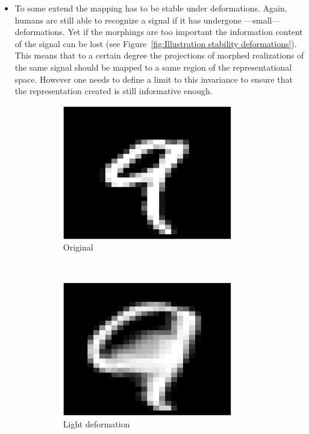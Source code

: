 \documentclass[a4paper,11pt]{report}
\begin{document}
\begin{itemize}
				\item To some extend the mapping has to be stable under deformations. Again, humans are still able to recognize a signal if it has undergone ---small--- deformations. Yet if the morphings are too important the information content of the signal can be lost (see Figure~\ref{fig:Illustration stability deformations}). This means that to a certain degree the projections of morphed realizations of the same signal should be mapped to a same region of the representational space. However one needs to define a limit to this invariance to ensure that the representation created is still informative enough.\\
				
				\begin{figure}[h]
					\centering
					\begin{subfigure}[t]{0.48\textwidth}
						\centering
						\includegraphics[height=2.3in]{im_nine_ori.eps}
						\caption{\centering Original}
					\end{subfigure}%
					~
					\begin{subfigure}[t]{0.48\textwidth}
						\centering
						\includegraphics[height=2.3in]{im_nine_def_Vsmall.eps}
						\caption{\centering Light deformation}
					\end{subfigure}%
					\\
					~
					\begin{subfigure}[t]{0.48\textwidth}

\end{subfigure}
\end{figure}
\end{itemize}
\end{document}
